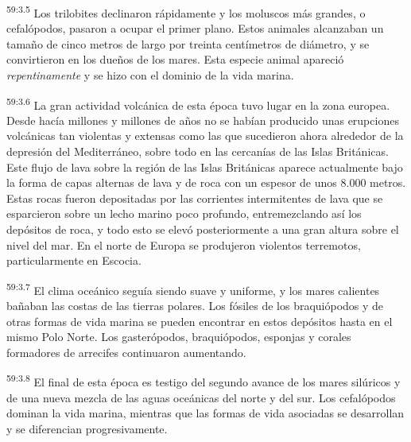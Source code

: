 \par
\textsuperscript{59:3.5} Los trilobites declinaron rápidamente y los moluscos más grandes, o cefalópodos, pasaron a ocupar el primer plano. Estos animales alcanzaban un tamaño de cinco metros de largo por treinta centímetros de diámetro, y se convirtieron en los dueños de los mares. Esta especie animal apareció \textit{repentinamente} y se hizo con el dominio de la vida marina.

\par
\textsuperscript{59:3.6} La gran actividad volcánica de esta época tuvo lugar en la zona europea. Desde hacía millones y millones de años no se habían producido unas erupciones volcánicas tan violentas y extensas como las que sucedieron ahora alrededor de la depresión del Mediterráneo, sobre todo en las cercanías de las Islas Británicas. Este flujo de lava sobre la región de las Islas Británicas aparece actualmente bajo la forma de capas alternas de lava y de roca con un espesor de unos 8.000 metros. Estas rocas fueron depositadas por las corrientes intermitentes de lava que se esparcieron sobre un lecho marino poco profundo, entremezclando así los depósitos de roca, y todo esto se elevó posteriormente a una gran altura sobre el nivel del mar. En el norte de Europa se produjeron violentos terremotos, particularmente en Escocia.

\par
\textsuperscript{59:3.7} El clima oceánico seguía siendo suave y uniforme, y los mares calientes bañaban las costas de las tierras polares. Los fósiles de los braquiópodos y de otras formas de vida marina se pueden encontrar en estos depósitos hasta en el mismo Polo Norte. Los gasterópodos, braquiópodos, esponjas y corales formadores de arrecifes continuaron aumentando.

\par
\textsuperscript{59:3.8} El final de esta época es testigo del segundo avance de los mares silúricos y de una nueva mezcla de las aguas oceánicas del norte y del sur. Los cefalópodos dominan la vida marina, mientras que las formas de vida asociadas se desarrollan y se diferencian progresivamente.


